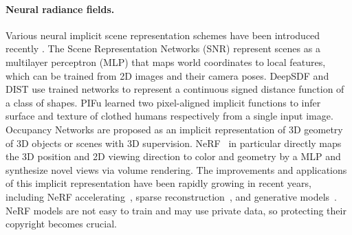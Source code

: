 \documentclass[10pt,twocolumn,letterpaper]{article}
\begin{document}
\paragraph{Neural radiance fields.} Various neural implicit scene representation schemes have been introduced recently \cite{niemeyer2020differentiable, yariv2020multiview, zhu2022neural}. The Scene Representation Networks (SNR) \cite{sitzmann2019scene} represent scenes as a multilayer perceptron (MLP) that maps world coordinates to local features, which can be trained from 2D images and their camera poses. DeepSDF \cite{park2019deepsdf} and DIST \cite{liu2020dist} use trained networks to represent a continuous signed distance function of a class of shapes. PIFu \cite{saito2019pifu} learned two pixel-aligned implicit functions to infer surface and texture of clothed humans respectively from a single input image. Occupancy Networks \cite{mescheder2019occupancy, peng2020convolutional} are proposed as an implicit representation of 3D geometry of 3D objects or scenes with 3D supervision. 
NeRF~\cite{nerf2020, zhu2023occlusion} in particular directly maps the 3D position and 2D viewing direction to color and geometry by a MLP and synthesize novel views via volume rendering. The improvements and applications of this implicit representation have been rapidly growing in recent years, including NeRF accelerating~\cite{fridovich2022plenoxels, neff2021donerf}, sparse reconstruction~\cite{yu2021pixelnerf, chen2021mvsnerf}, and generative models~\cite{schwarz2020graf, chan2021pi}. NeRF models are not easy to train and may use private data, so protecting their copyright becomes crucial.


\end{document}
